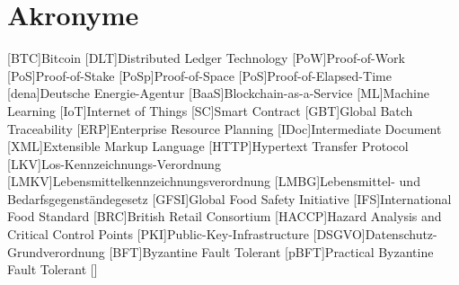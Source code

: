 \section*{Akronyme}            %
\begin{acronym}[HACCP]
	[BTC]{Bitcoin}
	[DLT]{Distributed Ledger Technology}
	[PoW]{Proof-of-Work}
  [PoS]{Proof-of-Stake}
  [PoSp]{Proof-of-Space}
  [PoS]{Proof-of-Elapsed-Time}
	[dena]{Deutsche Energie-Agentur}
	[BaaS]{Blockchain-as-a-Service}
	[ML]{Machine Learning}
	[IoT]{Internet of Things}
	[SC]{Smart Contract}
  [GBT]{Global Batch Traceability}
  [ERP]{Enterprise Resource Planning}
  [IDoc]{Intermediate Document}
  [XML]{Extensible Markup Language}
  [HTTP]{Hypertext Transfer Protocol}
  [LKV]{Los-Kennzeichnungs-Verordnung}
  [LMKV]{Lebensmittelkennzeichnungsverordnung}
  [LMBG]{Lebensmittel- und Bedarfsgegenständegesetz}
  [GFSI]{Global Food Safety Initiative}
  [IFS]{International Food Standard}
  [BRC]{British Retail Consortium}
  [HACCP]{Hazard Analysis and Critical Control Points}
  [PKI]{Public-Key-Infrastructure}
  [DSGVO]{Datenschutz-Grundverordnung}
  [BFT]{Byzantine Fault Tolerant}
  [pBFT]{Practical Byzantine Fault Tolerant}
  \acro{}[]{}
\end{acronym}

\newpage

\listoffigures
{}
\listoftables
{}
\newpage
